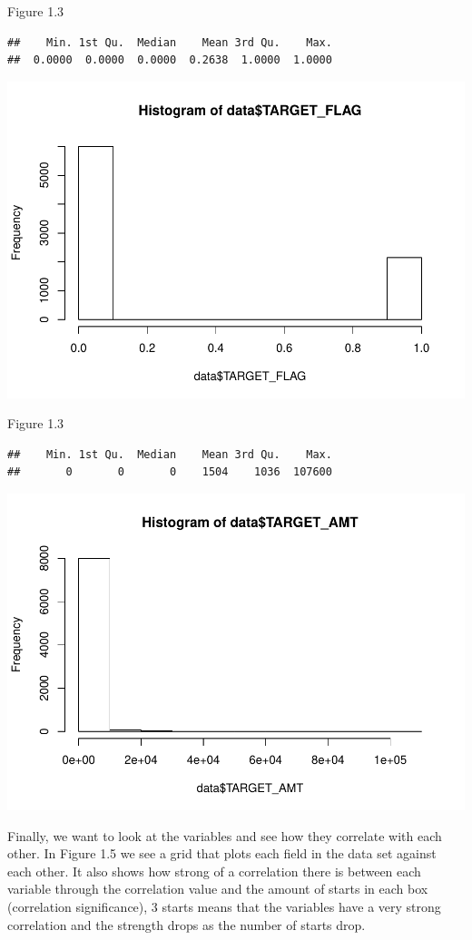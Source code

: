 \documentclass[]{article}
\begin{document}
Figure 1.3

\begin{verbatim}
##    Min. 1st Qu.  Median    Mean 3rd Qu.    Max. 
##  0.0000  0.0000  0.0000  0.2638  1.0000  1.0000
\end{verbatim}

\includegraphics{DATA621-Homework-4_files/figure-latex/unnamed-chunk-5-1.pdf}

Figure 1.3

\begin{verbatim}
##    Min. 1st Qu.  Median    Mean 3rd Qu.    Max. 
##       0       0       0    1504    1036  107600
\end{verbatim}

\includegraphics{DATA621-Homework-4_files/figure-latex/unnamed-chunk-6-1.pdf}

Finally, we want to look at the variables and see how they correlate
with each other. In Figure 1.5 we see a grid that plots each field in
the data set against each other. It also shows how strong of a
correlation there is between each variable through the correlation value
and the amount of starts in each box (correlation significance), 3
starts means that the variables have a very strong correlation and the
strength drops as the number of starts drop.
\end{document}
